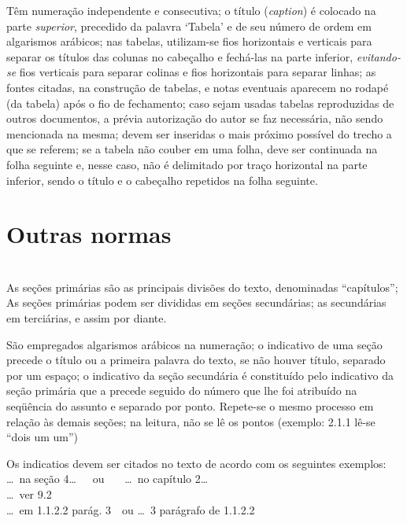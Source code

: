 \documentclass[espaco=simples,appendix=Name]{abnt}
\newcommand{\descrtype}{descriptionbf}
\renewenvironment{description}%
  {\expandafter\csname\descrtype\endcsname\edef\enddescrtype{end\descrtype}}
  {\expandafter\csname\enddescrtype\endcsname}
\newcommand{\ingles}[1]{\textsl{#1}}
\begin{document}
{\begin{description}
\item[Tabelas] \cite[5.9.2]{NBR14724:2001} Têm numeração independente e
  consecutiva; o título (\ingles{caption}) é colocado na parte
  \emph{superior}, precedido da palavra `Tabela' e de seu número de ordem
  em algarismos arábicos; nas tabelas, utilizam-se fios horizontais e
  verticais para separar os títulos das colunas no cabeçalho e fechá-las na
  parte inferior, \emph{evitando-se} fios verticais para separar colinas e
  fios horizontais para separar linhas; as fontes citadas, na construção de
  tabelas, e notas eventuais aparecem no rodapé (da tabela) após o fio de
  fechamento; caso sejam usadas tabelas reproduzidas de outros documentos,
  a prévia autorização do autor se faz necessária, não sendo mencionada na
  mesma; devem ser inseridas o mais próximo possível do trecho a que se
  referem; se a tabela não couber em uma folha, deve ser continuada na
  folha seguinte e, nesse caso, não é delimitado por traço horizontal na
  parte inferior, sendo o título e o cabeçalho repetidos na folha seguinte.

\end{description}


\section{Outras normas} \label{subsec: outras normas}

\def\descrtype{descriptionit}
\begin{description}

\item[Seções] \ \\
  \cite[seção~2.2]{NBR6024:1989} As seções primárias são as
  principais divisões do texto, denominadas ``capítulos''; As seções
  primárias podem ser divididas em seções secundárias; as secundárias em
  terciárias, e assim por diante.

  \cite[seção~2.3]{NBR6024:1989} São empregados algarismos arábicos
  na numeração; o indicativo de uma seção precede o título ou a primeira
  palavra do texto, se não houver título, separado por um espaço; o
  indicativo da seção secundária é constituído pelo indicativo da seção
  primária que a precede seguido do número que lhe foi atribuído na
  seqüência do assunto e separado por ponto. Repete-se o mesmo processo em
  relação às demais seções; na leitura, não se lê os pontos (exemplo: 2.1.1
  lê-se ``dois um um'')

  \cite[seção~4]{NBR6024:1989} Os indicatios devem ser citados no
  texto de acordo com os seguintes exemplos:\\
   \dots\ na seção 4\dots\ \ \  ou \ \ \ \dots\ no capítulo 2\dots\\
   \dots\ ver 9.2\\
   \dots\ em 1.1.2.2 parág. 3\ \  ou
   \dots\ 3 parágrafo de 1.1.2.2 


\end{description}}
\end{document}
